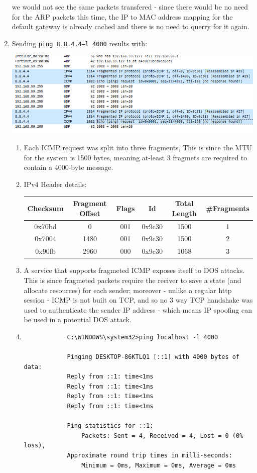 \begin{enumerate}[label=\alph*.]
	we would not see the same packets transfered - since there would be 
	no need for the ARP packets this time, the IP to MAC address mapping
	for the default gateway is already cached and there is no need to querry for it again.
	\item Sending \texttt{ping 8.8.4.4–l 4000} results with:
	\begin{center}
		\includegraphics[width=1.2 \textwidth]{Resources/icmp_frag.png}
	\end{center} 
	\begin{enumerate}
		\item Each ICMP request was split into three fragments,
		This is since the MTU for the system is 1500 bytes, meaning 
		at-least 3 fragmets are required to contain a 4000-byte
		message.
		\item IPv4 Header details:
		\begin{center}
			\begin{tabular}{ |c|c|c|c|c|c| } 
			\hline
			Checksum & Fragment Offset & Flags & Id & Total Length & \#Fragments \\ 
			\hline
			0x70bd   & 0 			   & 001   & 0x9c30  & 1500	   & 1			 \\ 
			0x7004   & 1480 		   & 001   & 0x9c30  & 1500	   & 2			 \\ 
			0x90fb   & 2960 		   & 000   & 0x9c30  & 1068	   & 3			 \\ 
			\hline
			\end{tabular}
		\end{center}
		\item A service that supports fragmeted ICMP exposes itself to DOS attacks.\\
		This is since fragmeted packets require the reciver to save a state (and allocate resources)
		for each sender; moreover - unlike a regular http session - ICMP is not built on TCP,
		and so no 3 way TCP handshake was used to authenticate the sender IP address - which means
		IP spoofing can be used in a potential DOS attack.
		\item \begin{verbatim}
			C:\WINDOWS\system32>ping localhost -l 4000

			Pinging DESKTOP-86KTLQ1 [::1] with 4000 bytes of data:
			Reply from ::1: time<1ms
			Reply from ::1: time<1ms
			Reply from ::1: time<1ms
			Reply from ::1: time<1ms

			Ping statistics for ::1:
				Packets: Sent = 4, Received = 4, Lost = 0 (0% loss),
			Approximate round trip times in milli-seconds:
				Minimum = 0ms, Maximum = 0ms, Average = 0ms
		\end{verbatim}
	\end{enumerate}
\end{enumerate}

